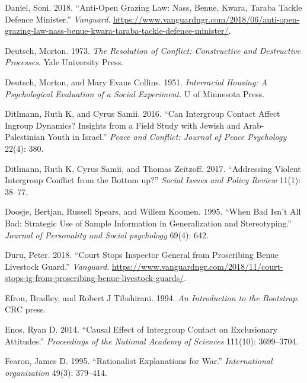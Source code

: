 \documentclass[11pt]{article}
\begin{document}
\begin{cslreferences}
\leavevmode\hypertarget{ref-daniel2018anti}{}%
Daniel, Soni. 2018. ``Anti-Open Grazing Law: Nass, Benue, Kwara, Taraba
Tackle Defence Minister.'' \emph{Vanguard}.
\url{https://www.vanguardngr.com/2018/06/anti-open-grazing-law-nass-benue-kwara-taraba-tackle-defence-minister/}.

\leavevmode\hypertarget{ref-deutsch1973resolution}{}%
Deutsch, Morton. 1973. \emph{The Resolution of Conflict: Constructive
and Destructive Processes}. Yale University Press.

\leavevmode\hypertarget{ref-deutsch1951interracial}{}%
Deutsch, Morton, and Mary Evans Collins. 1951. \emph{Interracial
Housing: A Psychological Evaluation of a Social Experiment}. U of
Minnesota Press.

\leavevmode\hypertarget{ref-ditlmann2016can}{}%
Ditlmann, Ruth K, and Cyrus Samii. 2016. ``Can Intergroup Contact Affect
Ingroup Dynamics? Insights from a Field Study with Jewish and
Arab-Palestinian Youth in Israel.'' \emph{Peace and Conflict: Journal of
Peace Psychology} 22(4): 380.

\leavevmode\hypertarget{ref-ditlmann2017addressing}{}%
Ditlmann, Ruth K, Cyrus Samii, and Thomas Zeitzoff. 2017. ``Addressing
Violent Intergroup Conflict from the Bottom up?'' \emph{Social Issues
and Policy Review} 11(1): 38--77.

\leavevmode\hypertarget{ref-doosje1995bad}{}%
Doosje, Bertjan, Russell Spears, and Willem Koomen. 1995. ``When Bad
Isn't All Bad: Strategic Use of Sample Information in Generalization and
Stereotyping.'' \emph{Journal of Personality and Social psychology}
69(4): 642.

\leavevmode\hypertarget{ref-duru2018court}{}%
Duru, Peter. 2018. ``Court Stops Inspector General from Proscribing
Benue Livestock Guard.'' \emph{Vanguard}.
\url{https://www.vanguardngr.com/2018/11/court-stops-ig-from-proscribing-benue-livestock-guards/}.

\leavevmode\hypertarget{ref-efron1994introduction}{}%
Efron, Bradley, and Robert J Tibshirani. 1994. \emph{An Introduction to
the Bootstrap}. CRC press.

\leavevmode\hypertarget{ref-enos2014causal}{}%
Enos, Ryan D. 2014. ``Causal Effect of Intergroup Contact on
Exclusionary Attitudes.'' \emph{Proceedings of the National Academy of
Sciences} 111(10): 3699--3704.

\leavevmode\hypertarget{ref-fearon1995rationalist}{}%
Fearon, James D. 1995. ``Rationalist Explanations for War.''
\emph{International organization} 49(3): 379--414.


\end{cslreferences}
\end{document}
